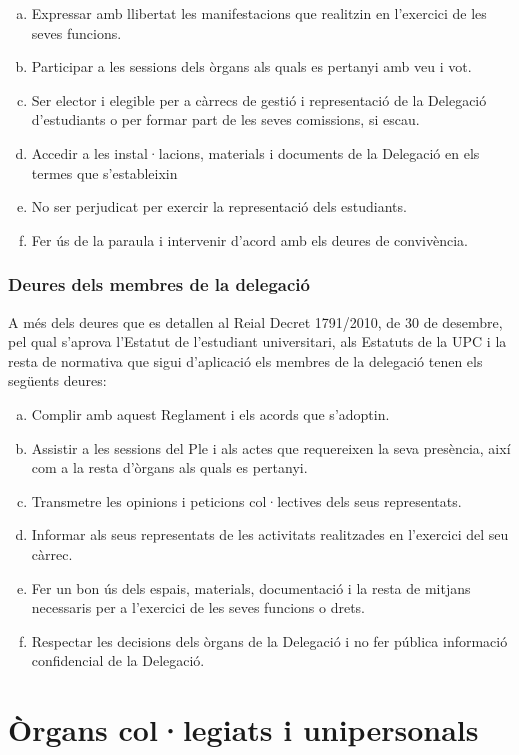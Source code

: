 \documentclass[a4paper,12pt]{article}
\begin{document}
\begin{enumerate}[a)]
	\item Expressar amb llibertat les manifestacions que realitzin en l'exercici de les seves funcions.
	\item Participar a les sessions dels òrgans als quals es pertanyi amb veu i vot.
	\item Ser elector i elegible per a càrrecs de gestió i representació de la Delegació d'estudiants o per formar part de les seves comissions, si escau.
	\item Accedir a les instal·lacions, materials i documents de la Delegació en els termes que s'estableixin
	\item No ser perjudicat per exercir la representació dels estudiants.
	\item Fer ús de la paraula i intervenir d'acord amb els deures de convivència.
\end{enumerate}

\subsubsection{Deures dels membres de la delegació}
A més dels deures que es detallen al Reial Decret 1791/2010, de 30 de desembre, pel qual s'aprova l'Estatut de l'estudiant universitari, als Estatuts de la UPC i la resta de normativa que sigui d'aplicació els membres de la delegació tenen els següents deures:

\begin{enumerate}[a)]
	\item Complir amb aquest Reglament i els acords que s'adoptin.
	\item Assistir a les sessions del Ple i als actes que requereixen la seva presència, així com a la resta d'òrgans als quals es pertanyi.
	\item Transmetre les opinions i peticions col·lectives dels seus representats.
	\item Informar als seus representats de les activitats realitzades en l'exercici del seu càrrec.
	\item Fer un bon ús dels espais, materials, documentació i la resta de mitjans necessaris per a l'exercici de les seves funcions o drets.
	\item Respectar les decisions dels òrgans de la Delegació i no fer pública informació confidencial de la Delegació.
\end{enumerate}

\section{Òrgans col·legiats i unipersonals}
\end{document}
